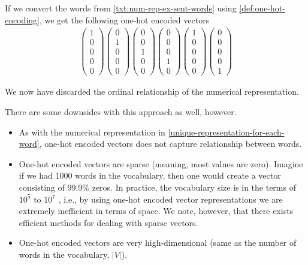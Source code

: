 If we convert the words from  \cref{txt:num-rep-ex-sent-words} using \cref{def:one-hot-encoding}, we get the following one-hot encoded vectors
\begin{align}
    \begin{pmatrix}
    1\\
    0\\
    0\\
    0\\
    0
    \end{pmatrix}
    \begin{pmatrix}
    0\\
    1\\
    0\\
    0\\
    0
    \end{pmatrix}
    \begin{pmatrix}
    0\\
    0\\
    1\\
    0\\
    0
    \end{pmatrix}
    \begin{pmatrix}
    0\\
    0\\
    0\\
    1\\
    0
    \end{pmatrix}
    \begin{pmatrix}
    1\\
    0\\
    0\\
    0\\
    0
    \end{pmatrix}
    \begin{pmatrix}
    0\\
    0\\
    0\\
    0\\
    1
    \end{pmatrix}
\end{align}

We now have discarded the ordinal relationship of the numerical representation.

There are some downsides with this approach as well, however.
\begin{itemize}
    \item As with the numerical representation in \cref{unique-representation-for-each-word}, one-hot encoded vectors does not capture relationship between words.
    \item One-hot encoded vectors are sparse (meaning, most values are zero). Imagine if we had 1000 words in the vocabulary, then one would create a vector consisting of 99.9\% zeros. In practice, the vocabulary size is in the terms of $10^5$ to $10^7$ \cite{mikolov2013b}, i.e., by using one-hot encoded vector representations we are extremely inefficient in terms of space. We note, however, that there exists efficient methods for dealing with sparse vectors.
    \item One-hot encoded vectors are very high-dimensional (same as the number of words in the vocabulary, $|V|$).
\end{itemize}


